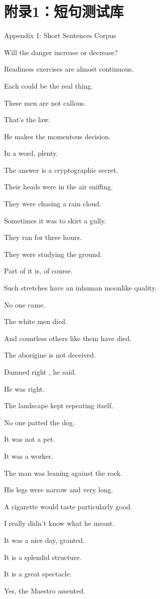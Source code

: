 \section*{附录1：短句测试库}{Appendix 1: Short Sentences Corpus}
 
Will the danger increase or decrease?
 
Readiness exercises  are almost continuous. 

Each could be the real thing. 

These men are not callous. 

That's the law. 

He makes the momentous decision. 

In a word, plenty.

The answer is a cryptographic secret. 

Their heads were in the air sniffing. 

They were chasing a rain cloud. 

Sometimes it was to skirt a gully. 

They ran for three hours. 

They were studying the ground. 

Part of it is, of course. 

Such stretches have an inhuman moonlike quality. 

No one came. 

The white men died. 

And countless others like them have died. 

The aborigine is not deceived.


Damned right , he said. 

He was right. 

The landscape kept repeating itself. 

No one patted the dog. 

It was not a pet. 

It was a worker. 

The man was leaning against the rock. 

His legs were narrow and very long. 

A cigarette would taste particularly good. 

I really didn't know what he meant. 

It was a nice day, granted. 

It is a splendid structure. 

It is a great spectacle. 

Yes, the Maestro assented. 

